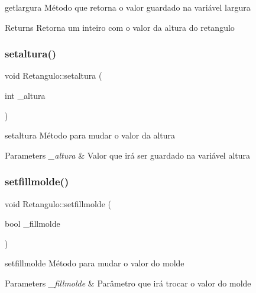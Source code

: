 getlargura Método que retorna o valor guardado na variável largura 

\begin{DoxyReturn}{Returns}
Retorna um inteiro com o valor da altura do retangulo 
\end{DoxyReturn}
\mbox{\label{class_retangulo_aa4c2a5395874545b17c28743a4362a6f}} 
\subsubsection{\texorpdfstring{setaltura()}{setaltura()}}
{\footnotesize\ttfamily void Retangulo\+::setaltura (\begin{DoxyParamCaption}\item[{int}]{\+\_\+altura }\end{DoxyParamCaption})}



setaltura Método para mudar o valor da altura 


\begin{DoxyParams}{Parameters}
{\em \+\_\+altura} & Valor que irá ser guardado na variável altura \\
\hline
\end{DoxyParams}
\mbox{\label{class_retangulo_a6dec6e7cba5c6de8834b00599ee1e150}} 
\subsubsection{\texorpdfstring{setfillmolde()}{setfillmolde()}}
{\footnotesize\ttfamily void Retangulo\+::setfillmolde (\begin{DoxyParamCaption}\item[{bool}]{\+\_\+fillmolde }\end{DoxyParamCaption})}



setfillmolde Método para mudar o valor do molde 


\begin{DoxyParams}{Parameters}
{\em \+\_\+fillmolde} & Parâmetro que irá trocar o valor do molde \\
\hline
\end{DoxyParams}
\mbox{\label{class_retangulo_afaaf315f9be859d0d83bae99baf645cb}} 
